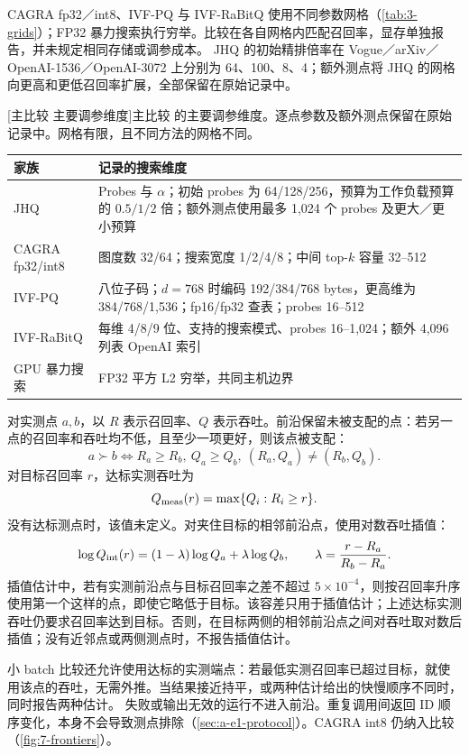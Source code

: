 CAGRA fp32／int8、IVF-PQ 与 IVF-RaBitQ \cite{cagra,pq,ivfrabitq} 使用不同参数网格（\cref{tab:3-grids}）；FP32 暴力搜索执行穷举。比较在各自网格内匹配召回率，显存单独报告，并未规定相同存储或调参成本。 JHQ 的初始精排倍率在 Vogue／arXiv／OpenAI-1536／OpenAI-3072 上分别为 64、100、8、4；额外测点将 JHQ 的网格向更高和更低召回率扩展，全部保留在原始记录中。

\par\medskip\noindent\begin{minipage}{\linewidth}
\centering\captionsetup{hypcap=false}
[主比较 主要调参维度]{主比较 的主要调参维度。逐点参数及额外测点保留在原始记录中。网格有限，且不同方法的网格不同。}
\label{tab:3-grids}
\footnotesize\setlength{\tabcolsep}{4pt}
\begin{tabularx}{\linewidth}{@{}>{\raggedright\arraybackslash}p{.22\linewidth}>{\raggedright\arraybackslash}X@{}}
\toprule
家族 & 记录的搜索维度 \\
\midrule
JHQ & Probes 与 $\alpha$；初始 probes 为 64/128/256，预算为工作负载预算的 $0.5/1/2$ 倍；额外测点使用最多 1,024 个 probes 及更大／更小预算 \\
CAGRA fp32/int8 & 图度数 32/64；搜索宽度 1/2/4/8；中间 top-$k$ 容量 32--512 \\
IVF-PQ & 八位子码；$d=768$ 时编码 192/384/768 bytes，更高维为 384/768/1,536；fp16/fp32 查表；probes 16--512 \\
IVF-RaBitQ & 每维 4/8/9 位、支持的搜索模式、probes 16--1,024；额外 4,096 列表 OpenAI 索引 \\
GPU 暴力搜索 & FP32 平方 L2 穷举，共同主机边界 \\
\bottomrule
\end{tabularx}
\end{minipage}\par\medskip

对实测点 $a,b$，以 $R$ 表示召回率、$Q$ 表示吞吐。前沿保留未被支配的点：若另一点的召回率和吞吐均不低，且至少一项更好，则该点被支配：
\[
 a\succ b\iff R_a\geq R_b,\ Q_a\geq Q_b,\
 (R_a,Q_a)\ne(R_b,Q_b).
\]
对目标召回率 $r$，达标实测吞吐为
\begin{equation}
Q_{\rm meas}(r)=\max\{Q_i:R_i\geq r\}.
\label{eq:3-measured-frontier}
\end{equation}
没有达标测点时，该值未定义。对夹住目标的相邻前沿点，使用对数吞吐插值：
\begin{equation}
\log Q_{\rm int}(r)=(1-\lambda)\log Q_a+\lambda\log Q_b,
\qquad \lambda=\frac{r-R_a}{R_b-R_a}.
\label{eq:3-interpolated-frontier}
\end{equation}
插值估计中，若有实测前沿点与目标召回率之差不超过 $5\times10^{-4}$，则按召回率升序使用第一个这样的点，即使它略低于目标。该容差只用于插值估计；上述达标实测吞吐仍要求召回率达到目标。否则，在目标两侧的相邻前沿点之间对吞吐取对数后插值；没有近邻点或两侧测点时，不报告插值估计。

小 batch 比较还允许使用达标的实测端点：若最低实测召回率已超过目标，就使用该点的吞吐，无需外推。当结果接近持平，或两种估计给出的快慢顺序不同时，同时报告两种估计。
失败或输出无效的运行不进入前沿。重复调用间返回 ID 顺序变化，本身不会导致测点排除（\cref{sec:a-e1-protocol}）。CAGRA int8 仍纳入比较（\cref{fig:7-frontiers}）。
